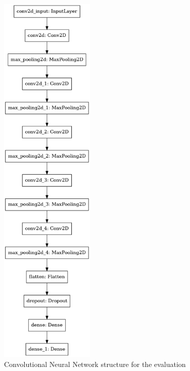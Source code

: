 \documentclass[13pt]{article}
\begin{document}
\begin{figure}
\centering
\centerline{\includegraphics[width=4.5cm]{plots/cnn.png}}
    \vspace{5mm}
\caption{Convolutional Neural Network structure for the evaluation}\label{wrap-fig:cnn}
\end{figure}
\end{document}
